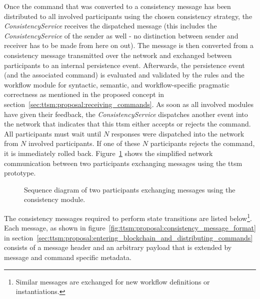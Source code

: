 Once the command that was converted to a consistency message has been distributed to all involved participants using the chosen consistency strategy, the \textit{ConsistencyService} receives the dispatched message (this includes the \textit{ConsistencyService} of the sender as well - no distinction between sender and receiver has to be made from here on out). The message is then converted from a consistency message transmitted over the network and exchanged between participants to an internal persistence event. Afterwards, the persistence event (and the associated command) is evaluated and validated by the rules and the workflow module for syntactic, semantic, and workflow-specific pragmatic correctness as mentioned in the proposed concept in section~\ref{sec:ttsm:proposal:receiving_commands}. As soon as all involved modules have given their feedback, the \textit{ConsistencyService} dispatches another event into the network that indicates that this \gls{ttsm} either accepts or rejects the command. All participants must wait until $N$ responses were dispatched into the network from $N$ involved participants. If one of these $N$ participants rejects the command, it is immediately rolled back. Figure~\ref{fig:ttsm:prototype:consistency_module_sequence_diagram} shows the simplified network communication between two participants exchanging messages using the \gls{ttsm} prototype.

\begin{figure}[h]
    \caption{Sequence diagram of two participants exchanging messages using the consistency module.}
    \label{fig:ttsm:prototype:consistency_module_sequence_diagram}
\end{figure}

The consistency messages required to perform state transitions are listed below\footnote{Similar messages are exchanged for new workflow definitions or instantiations.}. Each message, as shown in figure~\ref{fig:ttsm:proposal:consistency_message_format} in section~\ref{sec:ttsm:proposal:entering_blockchain_and_distributing_commands} consists of a message header and an arbitrary payload that is extended by message and command specific metadata.

